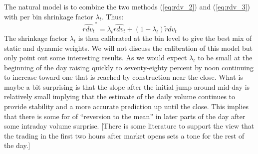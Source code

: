The natural  model is to combine the two methods (\ref{eq:rdv_2}) and (\ref{eq:rdv_3}) with per bin shrinkage factor $\lambda_t$. Thus:
	\begin{equation}\label{eq:rdv_4}
	\widehat{rdv_t}^* = \lambda_t \widehat{rdv_t} + (1-\lambda_t) \tilde{r} dv_t
	\end{equation}
The shrinkage factor $\lambda_t$ is then calibrated at the bin level to give the best mix of static and dynamic weights. We will not discuss the calibration of this model but only point out some interesting results. As we would expect $\lambda_t$ to be small at the beginning of the day raising quickly to seventy-eighty percent by noon continuing to increase toward one that is reached by construction near the close. What is maybe a bit surprising is that the slope after the initial jump around mid-day is relatively small implying that the estimate of the daily volume continues to provide stability and a more accurate prediction up until the close. This implies that there is some for of ``reversion to the mean'' in later parts of the day after some intraday volume surprise. [There is some literature to support the view that the trading in the first two hours after market opens sets a tone for the rest of the day.]


